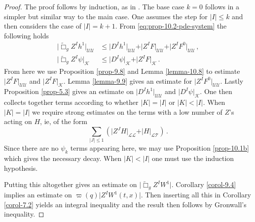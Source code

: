 \documentclass[11pt, a4paper]{amsart}
\numberwithin{equation}{section}
\numberwithin{theorem}{section}
\newcommand{\tbox}{\widetilde{\Box}}
\newcommand{\UU}{{\mathcal{U} \mathcal{U}}}
\newcommand{\LL}{{\mathcal{L} \mathcal{L}}}
\newcommand{\LT}{{\mathcal{L} \mathcal{T}}}
\newcommand{\K}{\mathcal{K}}
\newcommand{\vK}{\vert K \vert}
\newcommand{\I}{\vert I \vert}
\newcommand{\J}{\vert J \vert}
\begin{document}
\begin{proof}
The proof follows by induction, as in \cite{LR:04}. The base case $k=0$ follows in a simpler but similar way to the main case. One assumes the step for $\I \leq k$ and then considers the case of $\I = k+1$. 
From \eqref{eq:prop-10.2-pde-system} the following holds
\begin{align*}
\vert \tbox_g Z^I h^1\vert_\UU
& \leq \vert D^I h^1 \vert_\UU + \vert Z^I F \vert_\UU + \vert Z^I F^0 \vert_\UU \,, \\
\vert \tbox_g Z^I \psi \vert_\K & \leq \vert D^I \psi \vert_\K + \vert Z^I F \vert _\K \,.
\end{align*}
From here we use Proposition \ref{prop-9.8} and Lemma \ref{lemma-10.8} to estimate $\vert Z^I F \vert_\UU$ and $\vert Z^I F \vert_\K$. Lemma \ref{lemma-9.9} gives an estimate for $\vert Z^I F^0\vert_\UU$. Lastly Proposition \ref{prop-5.3} gives an estimate on $\vert D^I h^1\vert_\UU$ and $\vert D^I \psi \vert_\K$. 
One then collects together terms according to whether $\vK=\I$ or $\vK < \I$. When $\vK=\I$ we require strong estimates on the terms with a low number of $Z$'s acting on $H$, ie, of the form
$$ \sum_{\J \leq 1} \left( \vert Z^J H \vert_\LL + \vert H \vert_\LT \right) \,. $$
Since there are no $\psi_k$ terms appearing here, we may use Proposition \ref{prop-10.1b} which gives the necessary decay. 
When $\vK < \I$ one must use the induction hypothesis. 

Putting this altogether gives an estimate on $\vert \tbox_g Z^I W^1 \vert$. Corollary \ref{corol-9.4} implies an estimate on $\varpi (q) \vert Z^I W^1(t,x) \vert$. 
Then inserting all this in Corollary \ref{corol-7.2} yields an integral inequality and the result then follows by Gronwall's inequality.  
\end{proof}
\end{document}
